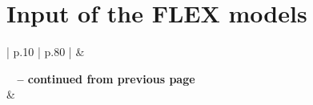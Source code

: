 \chapter{Input of the FLEX models}
\label{appendix:inputdata}

\begin{center}
    \small
    \begin{longtable}{ | p{} | p{} | }
        \hline 
         &  \\ 
        \hline 
        \endfirsthead

        {{\bfseries \tablename\ \thetable{} -- continued from previous page}} \\
        \hline {} &
         \\  
        \endhead

         \\ 
        \hline
        \endfoot


\end{longtable}
\end{center}
